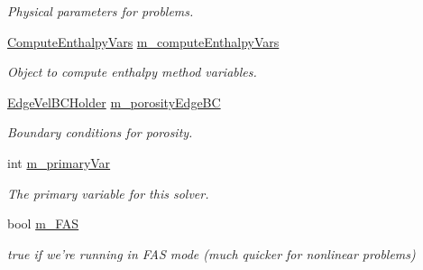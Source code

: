 \begin{DoxyCompactItemize}
\begin{DoxyCompactList}\small\item\em Physical parameters for problems. \end{DoxyCompactList}\item 
\hypertarget{class_a_m_r_non_linear_v_c_op_aaae922c07d59e1371e874cf5bf6560ea}{\hyperlink{class_compute_enthalpy_vars}{Compute\-Enthalpy\-Vars} \hyperlink{class_a_m_r_non_linear_v_c_op_aaae922c07d59e1371e874cf5bf6560ea}{m\-\_\-compute\-Enthalpy\-Vars}}\label{class_a_m_r_non_linear_v_c_op_aaae922c07d59e1371e874cf5bf6560ea}

\begin{DoxyCompactList}\small\item\em Object to compute enthalpy method variables. \end{DoxyCompactList}\item 
\hypertarget{class_a_m_r_non_linear_v_c_op_a86f0f6c7aaf6c894ae44714299b8392d}{\hyperlink{class_edge_vel_b_c_holder}{Edge\-Vel\-B\-C\-Holder} \hyperlink{class_a_m_r_non_linear_v_c_op_a86f0f6c7aaf6c894ae44714299b8392d}{m\-\_\-porosity\-Edge\-B\-C}}\label{class_a_m_r_non_linear_v_c_op_a86f0f6c7aaf6c894ae44714299b8392d}

\begin{DoxyCompactList}\small\item\em Boundary conditions for porosity. \end{DoxyCompactList}\item 
int \hyperlink{class_a_m_r_non_linear_v_c_op_ac47daa8121191060133d61b1cdedccc1}{m\-\_\-primary\-Var}
\begin{DoxyCompactList}\small\item\em The primary variable for this solver. \end{DoxyCompactList}\item 
\hypertarget{class_a_m_r_non_linear_v_c_op_a1840e213652c5bc1d31fd4883233052a}{bool \hyperlink{class_a_m_r_non_linear_v_c_op_a1840e213652c5bc1d31fd4883233052a}{m\-\_\-\-F\-A\-S}}\label{class_a_m_r_non_linear_v_c_op_a1840e213652c5bc1d31fd4883233052a}

\begin{DoxyCompactList}\small\item\em true if we're running in F\-A\-S mode (much quicker for nonlinear problems) \end{DoxyCompactList}\end{DoxyCompactItemize}
